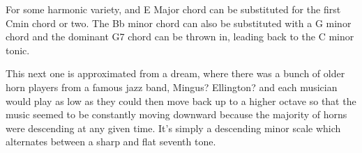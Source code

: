 \documentclass[a5paper,twoside,9pt]{extbook}
\newtheorem{I Surrender}{Definition}
\begin{document}
\begin{quote}
{%
\parindent 0pt
\noindent
\ifx\preLilyPondExample \undefined
\else
  \expandafter\preLilyPondExample
\fi
\def\lilypondbook{}%

\ifx\postLilyPondExample \undefined
\else
  \expandafter\postLilyPondExample
\fi
}
\end{quote}

For some harmonic variety, and E Major chord can be substituted for the first Cmin chord or two. The Bb minor chord can also be substituted with a G minor chord and the dominant G7 chord can be thrown in, leading back to the C minor tonic.

This next one is approximated from a dream, where there was a bunch of older horn players from a famous jazz band, Mingus? Ellington? and each musician would play as low as they could then move back up to a higher octave so that the music seemed to be constantly moving downward because the majority of horns were descending at any given time. It's simply a descending minor scale which alternates between a sharp and flat seventh tone.

\begin{quote}
{%
\parindent 0pt
\noindent
\ifx\preLilyPondExample \undefined
\else
  \expandafter\preLilyPondExample
\fi
\def\lilypondbook{}%

\ifx\postLilyPondExample \undefined
\else
  \expandafter\postLilyPondExample
\fi
}
\end{quote}
\end{document}
